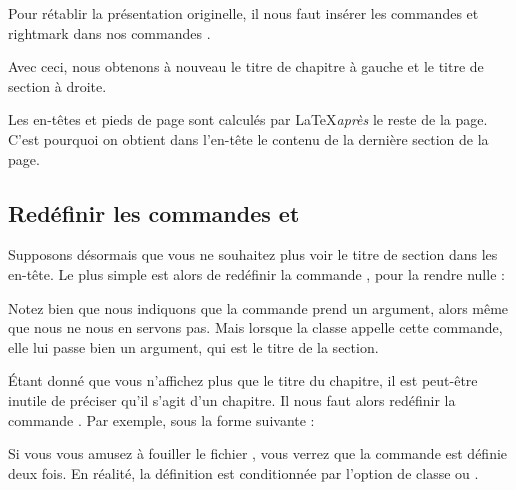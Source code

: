 Pour rétablir la présentation originelle, il nous faut insérer les commandes  et {rightmark} dans nos commandes .

\begin{latexcode}
\fancyhead[LE,RO]{}
\fancyhead[RE]{\leftmark}
\fancyhead[LO]{\rightmark}
\end{latexcode}

Avec ceci, nous obtenons à nouveau le titre de chapitre à gauche et le titre de section à droite.

\begin{attention}
Les en-têtes et pieds de page sont calculés par \LaTeX \emph{après} le reste de la page. C'est pourquoi on obtient dans l'en-tête le contenu de la dernière section de la page.
\end{attention}

\subsection{Redéfinir les commandes  et }

Supposons désormais que vous ne souhaitez plus voir le titre de section dans les en-tête. Le plus simple est alors de redéfinir la commande , pour la rendre nulle :

\begin{latexcode}
\renewcommand{\sectionmark}[1]{}
\end{latexcode}

\begin{attention}
Notez bien que nous indiquons que la commande  prend un argument, alors même que nous ne nous en servons pas. Mais lorsque la classe  appelle cette commande, elle lui passe bien un argument, qui est le titre de la section.
\end{attention}

Étant donné que vous n'affichez plus que le titre du chapitre, il est peut-être inutile de préciser qu'il s'agit d'un chapitre. Il nous faut alors redéfinir la commande . Par exemple, sous la forme suivante :

\begin{latexcode}
\renewcommand{\chaptermark}[1]{\markboth {\MakeUppercase{\thechapter #1}}{}}
\end{latexcode}


\begin{plusloins}
Si vous vous amusez à fouiller le fichier , vous verrez que la commande  est définie deux fois. En réalité, la définition est conditionnée par l'option de classe  ou .
\end{plusloins}

